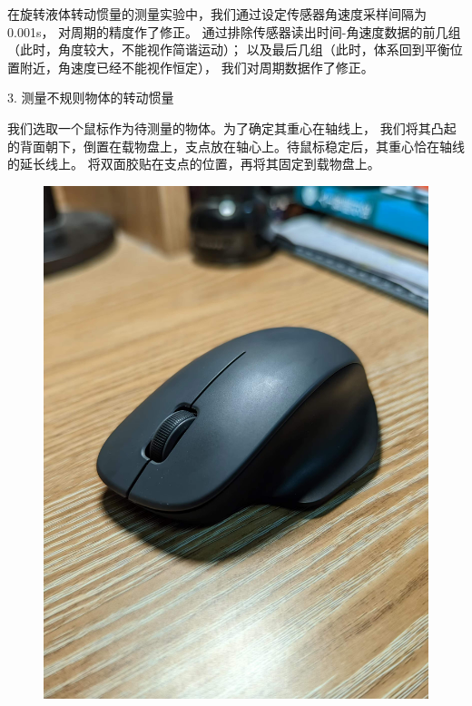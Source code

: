 \documentclass[12pt,hyperref,a4paper,UTF8]{ctexart}
\begin{document}
在旋转液体转动惯量的测量实验中，我们通过设定传感器角速度采样间隔为0.001s，
对周期的精度作了修正。
通过排除传感器读出时间-角速度数据的前几组（此时，角度较大，不能视作简谐运动）；
以及最后几组（此时，体系回到平衡位置附近，角速度已经不能视作恒定），
我们对周期数据作了修正。

\begin{table}[h!]
\centering
{}
\caption{测量扭丝的扭转系数 - $ \Delta \text{t} = \text{0.1s} $}
\end{table}

3. 测量不规则物体的转动惯量

我们选取一个鼠标作为待测量的物体。为了确定其重心在轴线上，
我们将其凸起的背面朝下，倒置在载物盘上，支点放在轴心上。待鼠标稳定后，其重心恰在轴线的延长线上。
将双面胶贴在支点的位置，再将其固定到载物盘上。

\begin{figure}[htbp]
    \centering
    \includegraphics[scale=0.1]{mouse.eps}
    \caption{}
\end{figure}
\end{document}
